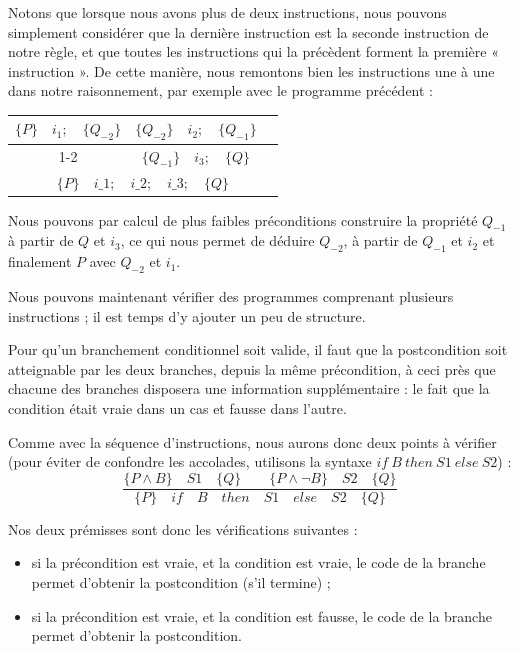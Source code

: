 

Notons que lorsque nous avons plus de deux instructions, nous pouvons simplement
considérer que la dernière instruction est la seconde instruction de notre règle,
et que toutes les instructions qui la précèdent forment la première « instruction ».
De cette manière, nous remontons bien les instructions une à une dans notre
raisonnement, par exemple avec le programme précédent :


\begin{center}
\begin{tabular}{ccc}
  $\{P\}\quad i_1 ; \quad \{Q_{-2}\}$ & $\{Q_{-2}\}\quad i_2 ; \quad \{Q_{-1}\}$ & \\
  \cline{1-2}
  \multicolumn{2}{c}{$\{P\}\quad i\_1 ; \quad i\_2 ; \quad \{Q_{-1}\}$} & $\{Q_{-1}\} \quad i_3 ; \quad \{Q\}$\\
  \hline
  \multicolumn{3}{c}{$\{P\}\quad i\_1 ; \quad i\_2 ; \quad i\_3; \quad \{ Q \}$}
\end{tabular}
\end{center}

Nous pouvons par calcul de plus faibles préconditions construire la propriété
$Q_{-1}$ à partir de $Q$ et $i_3$, ce qui nous permet de déduire $Q_{-2}$, à
partir de $Q_{-1}$ et $i_2$ et finalement $P$ avec $Q_{-2}$ et $i_1$.



Nous pouvons maintenant vérifier des programmes comprenant plusieurs
instructions ; il est temps d'y ajouter un peu de structure.





Pour qu'un branchement conditionnel soit valide, il faut que la postcondition
soit atteignable par les deux branches, depuis la même précondition, à ceci
près que chacune des branches disposera une information supplémentaire : le fait
que la condition était vraie dans un cas et fausse dans l'autre.



Comme avec la séquence d'instructions, nous aurons donc deux points à vérifier
(pour éviter de confondre les accolades, utilisons la syntaxe
$if\ B\ then\ S1\ else\ S2$) :
$$\dfrac{\{P \wedge B\}\quad S1\quad \{Q\} \quad \quad \{P \wedge \neg B\}\quad S2\quad \{Q\}}{\{P\}\quad if\quad B\quad then\quad S1\quad else\quad S2 \quad \{Q\}}$$



Nos deux prémisses sont donc les vérifications suivantes :
\begin{itemize}
  \item si la précondition est vraie, et la condition est vraie, le code de la
        branche  permet d'obtenir la postcondition (s'il termine) ;
  \item si la précondition est vraie, et la condition est fausse, le code de la
        branche  permet d'obtenir la postcondition.
\end{itemize}


